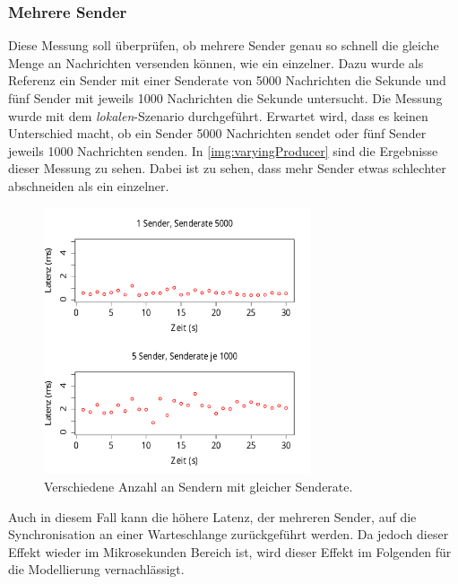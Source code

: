 \subsubsection{Mehrere Sender}
Diese Messung soll überprüfen, ob mehrere Sender genau so schnell die gleiche Menge an Nachrichten versenden können, wie ein einzelner. Dazu wurde als Referenz ein Sender mit einer Senderate von 5000 Nachrichten die Sekunde und fünf Sender mit jeweils 1000 Nachrichten die Sekunde untersucht. Die Messung wurde mit dem \textit{lokalen}-Szenario durchgeführt. Erwartet wird, dass es keinen Unterschied macht, ob ein Sender 5000 Nachrichten sendet oder fünf Sender jeweils 1000 Nachrichten senden. 
In \autoref{img:varyingProducer} sind die Ergebnisse dieser Messung zu sehen. Dabei ist zu sehen, dass mehr Sender etwas schlechter abschneiden als ein einzelner. 
\begin{figure}
\center
  \includegraphics[width=0.7\textwidth]{images/measurement/varying-producer.pdf}
  \caption{Verschiedene Anzahl an Sendern mit gleicher Senderate.}
  \label{img:varyingProducer}
\end{figure}
Auch in diesem Fall kann die höhere Latenz, der mehreren Sender, auf die Synchronisation an einer Warteschlange zurückgeführt werden. Da jedoch dieser Effekt wieder im Mikrosekunden Bereich ist, wird dieser Effekt im Folgenden für die Modellierung vernachlässigt. 
